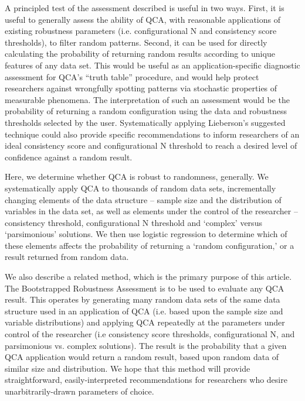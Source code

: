 \documentclass[12pt]{article}
\begin{document}
{%

A principled test of the assessment \citet{lieberson_2004} described is useful in two ways. First, it is useful to generally assess the ability of QCA, with reasonable applications of existing robustness parameters (i.e. configurational N and consistency score thresholds), to filter random patterns. Second, it can be used for directly calculating the probability of returning random results according to unique features of any data set. This would be useful as an application-specific diagnostic assessment for QCA's ``truth table'' procedure, and would help protect researchers against wrongfully spotting patterns via stochastic properties of measurable phenomena. The interpretation of such an assessment would be the probability of returning a random configuration using the data and robustness thresholds selected by the user. Systematically applying Lieberson's suggested technique could also provide specific recommendations to inform researchers of an ideal consistency score and configurational N threshold to reach a desired level of confidence against a random result. 


Here, we determine whether QCA is robust to randomness, generally. We systematically apply QCA to thousands of random data sets, incrementally changing elements of the data structure -- sample size and the distribution of variables in the data set, as well as elements under the control of the researcher -- consistency threshold, configurational N threshold and `complex' versus `parsimonious' solutions. We then use logistic regression to determine which of these elements affects the probability of returning a `random configuration,' or a result returned from random data. 

We also describe a related method, which is the primary purpose of this article. The Bootstrapped Robustness Assessment is to be used to evaluate any QCA result. This operates by generating many random data sets of the same data structure used in an application of QCA (i.e. based upon the sample size and variable distributions) and applying QCA repeatedly at the parameters under control of the researcher (i.e consistency score thresholds, configurational N, and parsimonious vs. complex solutions). The result is the probability that a given QCA application would return a random result, based upon random data of similar size and distribution. We hope that this method will provide straightforward, easily-interpreted recommendations for researchers who desire unarbitrarily-drawn parameters of choice. 




}
\end{document}
